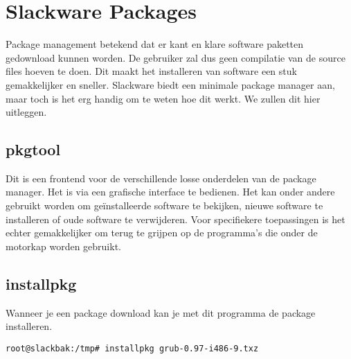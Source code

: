%
%
%
%

\chapter{Slackware Packages}\label{app.package}
Package management betekend dat er kant en klare software paketten gedownload kunnen worden. De gebruiker zal dus geen compilatie van de source files hoeven te doen. Dit maakt het installeren van software een stuk gemakkelijker en sneller. Slackware biedt een minimale package manager aan, maar toch is het erg handig om te weten hoe dit werkt. We zullen dit hier uitleggen. 

\section{pkgtool}
Dit is een frontend voor de verschillende losse onderdelen van de package manager. Het is via een grafische interface te bedienen. Het kan onder andere gebruikt worden om ge\"{i}nstalleerde software te bekijken, nieuwe software te installeren of oude software te verwijderen. Voor specifiekere toepassingen is het echter gemakkelijker om terug te grijpen op de programma's die onder de motorkap worden gebruikt. 

\section{installpkg}
Wanneer je een package download kan je met dit programma de package installeren. 
\begin{lstlisting}
root@slackbak:/tmp# installpkg grub-0.97-i486-9.txz 
\end{lstlisting}


